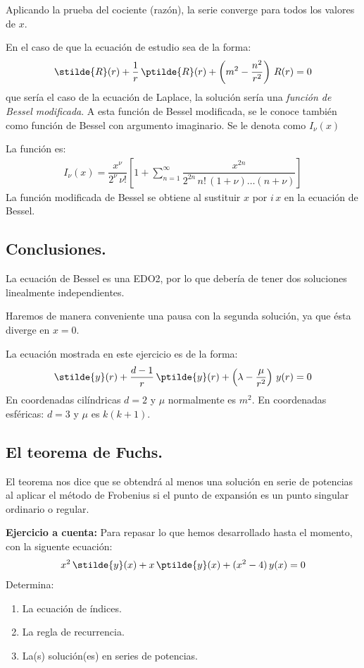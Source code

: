 Aplicando la prueba del cociente (razón), la serie converge para todos los valores de $x$.
\par
En el caso de que la ecuación de estudio sea de la forma:
\begin{align*}
\stilde{R} (r) + \dfrac{1}{r} \, \ptilde{R} (r) + \left( m^{2} - \dfrac{n^{2}}{r^{2}} \right) \, R(r) = 0
\end{align*}
que sería el caso de la ecuación de Laplace, la solución sería una \emph{función de Bessel modificada}. A esta función de Bessel modificada, se le conoce también como función de Bessel con argumento imaginario. Se le denota como $I_{\nu}(x)$
\par
La función es:
\begin{align*}
I_{\nu}(x) = \dfrac{x^{\nu}}{2^{\nu} \, \nu!} \left[ 1 + \sum_{n=1}^{\infty} \dfrac{x^{2n}}{2^{2n} \, n! \, (1 + \nu) \ldots (n + \nu)} \right]
\end{align*}
La función modificada de Bessel se obtiene al sustituir $x$ por $i \, x$ en la ecuación de Bessel.

\subsection*{Conclusiones.}

La ecuación de Bessel es una EDO2, por lo que debería de tener dos soluciones linealmente independientes.
\par
Haremos de manera conveniente una pausa con la segunda solución, ya que ésta diverge en $x=0$.
\par
La ecuación mostrada en este ejercicio es de la forma:
\begin{align*}
\stilde{y}(r) + \dfrac{d - 1}{r} \, \ptilde{y}(r) + \left( \lambda - \dfrac{\mu}{r^{2}} \right) \, y(r) = 0
\end{align*}
En coordenadas cilíndricas $d = 2$ y $\mu$ normalmente es $m^{2}$. En coordenadas esféricas: $d = 3$ y $\mu$ es $k(k+1)$.

\subsection{El teorema de Fuchs.}
El teorema nos dice que se obtendrá al menos una solución en serie de potencias al aplicar el método de Frobenius si el punto de expansión es un punto singular ordinario o regular. 

\textbf{Ejercicio a cuenta:}
Para repasar lo que hemos desarrollado hasta el momento, con la siguente ecuación:
\begin{align*}
x^{2} \, \stilde{y}(x) + x \, \ptilde{y}(x) + (x^{2} - 4) \, y(x) = 0
\end{align*}
Determina:
\begin{enumerate}
\item La ecuación de índices.
\item La regla de recurrencia.
\item La(s) solución(es) en series de potencias.
\end{enumerate}
